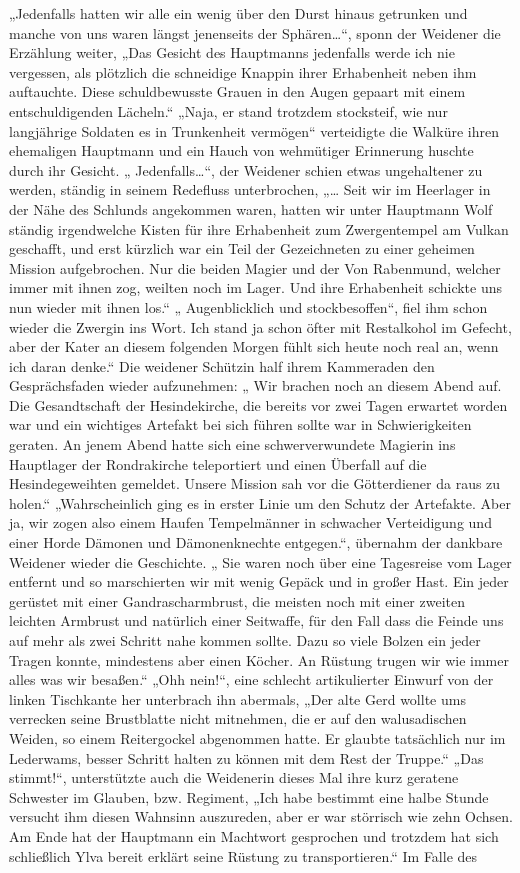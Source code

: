 „Jedenfalls hatten wir alle ein wenig über den Durst hinaus getrunken und manche von uns waren längst jenenseits der Sphären…“, sponn der Weidener die Erzählung weiter, „Das Gesicht des Hauptmanns jedenfalls werde ich nie vergessen, als plötzlich die schneidige Knappin ihrer Erhabenheit neben ihm auftauchte. Diese schuldbewusste Grauen in den Augen gepaart mit einem entschuldigenden Lächeln.“ „Naja, er stand trotzdem stocksteif, wie nur langjährige Soldaten es in Trunkenheit vermögen“ verteidigte die Walküre ihren ehemaligen Hauptmann und ein Hauch von wehmütiger Erinnerung huschte durch ihr Gesicht. „ Jedenfalls…“, der Weidener schien etwas ungehaltener zu werden, ständig in seinem Redefluss unterbrochen, „… Seit wir im Heerlager in der Nähe des Schlunds angekommen waren, hatten wir unter Hauptmann Wolf ständig irgendwelche Kisten für ihre Erhabenheit zum Zwergentempel am Vulkan geschafft, und erst kürzlich war ein Teil der Gezeichneten zu einer geheimen Mission aufgebrochen. Nur die beiden Magier und der Von Rabenmund, welcher immer mit ihnen zog, weilten noch im Lager. Und ihre Erhabenheit schickte uns nun wieder mit ihnen los.“ „ Augenblicklich und stockbesoffen“, fiel ihm schon wieder die Zwergin ins Wort. Ich stand ja schon öfter mit Restalkohol im Gefecht, aber der Kater an diesem folgenden Morgen fühlt sich heute noch real an, wenn ich daran denke.“ Die weidener Schützin half ihrem Kammeraden den Gesprächsfaden wieder aufzunehmen: „ Wir brachen noch an diesem Abend auf. Die Gesandtschaft der Hesindekirche, die bereits vor zwei Tagen erwartet worden war und ein wichtiges Artefakt bei sich führen sollte war in Schwierigkeiten geraten. An jenem Abend hatte sich eine schwerverwundete Magierin ins Hauptlager der Rondrakirche teleportiert und einen Überfall auf die Hesindegeweihten gemeldet. Unsere Mission sah vor die Götterdiener da raus zu holen.“ „Wahrscheinlich ging es in erster Linie um den Schutz der Artefakte. Aber ja, wir zogen also einem Haufen Tempelmänner in schwacher Verteidigung und einer Horde Dämonen und Dämonenknechte entgegen.“, übernahm der dankbare Weidener wieder die Geschichte. „ Sie waren noch über eine Tagesreise vom Lager entfernt und so marschierten wir mit wenig Gepäck und in großer Hast. Ein jeder gerüstet mit einer Gandrascharmbrust, die meisten noch mit einer zweiten leichten Armbrust und natürlich einer Seitwaffe, für den Fall dass die Feinde uns auf mehr als zwei Schritt nahe kommen sollte. Dazu so viele Bolzen ein jeder Tragen konnte, mindestens aber einen Köcher. An Rüstung trugen wir wie immer alles was wir besaßen.“ „Ohh nein!“, eine schlecht artikulierter Einwurf von der linken Tischkante her unterbrach ihn abermals, „Der alte Gerd wollte ums verrecken seine Brustblatte nicht mitnehmen, die er auf den walusadischen Weiden, so einem Reitergockel abgenommen hatte. Er glaubte tatsächlich nur im Lederwams, besser Schritt halten zu können mit dem Rest der Truppe.“ „Das stimmt!“, unterstützte auch die Weidenerin dieses Mal ihre kurz geratene Schwester im Glauben, bzw. Regiment, „Ich habe bestimmt eine halbe Stunde versucht ihm diesen Wahnsinn auszureden, aber er war störrisch wie zehn Ochsen. Am Ende hat der Hauptmann ein Machtwort gesprochen und trotzdem hat sich schließlich Ylva bereit erklärt seine Rüstung zu transportieren.“ Im Falle des 